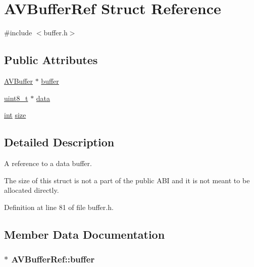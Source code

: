 \hypertarget{struct_a_v_buffer_ref}{}\section{A\+V\+Buffer\+Ref Struct Reference}
\label{struct_a_v_buffer_ref}


{\ttfamily \#include $<$buffer.\+h$>$}

\subsection*{Public Attributes}
\begin{DoxyCompactItemize}
\item 
\hyperlink{group__lavu__buffer_ga501d49df442180d584f255aa97b2549d}{A\+V\+Buffer} $\ast$ \hyperlink{struct_a_v_buffer_ref_a3c692274c56720d7903bbd35bcaec3a2}{buffer}
\item 
\hyperlink{lib-src_2ffmpeg_2win32_2stdint_8h_a9a941819355e6f658991890ff66b4b0e}{uint8\+\_\+t} $\ast$ \hyperlink{struct_a_v_buffer_ref_acb8452e99cd75074b93800b532c6ea4b}{data}
\item 
\hyperlink{xmltok_8h_a5a0d4a5641ce434f1d23533f2b2e6653}{int} \hyperlink{struct_a_v_buffer_ref_a55f17b82a5af97259a5e8a3fd9647a08}{size}
\end{DoxyCompactItemize}


\subsection{Detailed Description}
A reference to a data buffer.

The size of this struct is not a part of the public A\+BI and it is not meant to be allocated directly. 

Definition at line 81 of file buffer.\+h.



\subsection{Member Data Documentation}
\subsubsection[{\texorpdfstring{buffer}{buffer}}]{$\ast$ A\+V\+Buffer\+Ref\+::buffer}\hypertarget{struct_a_v_buffer_ref_a3c692274c56720d7903bbd35bcaec3a2}{}\label{struct_a_v_buffer_ref_a3c692274c56720d7903bbd35bcaec3a2}


